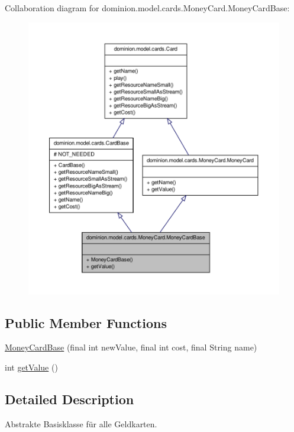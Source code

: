 \-Collaboration diagram for dominion.\-model.\-cards.\-Money\-Card.\-Money\-Card\-Base\-:
\nopagebreak
\begin{figure}[H]
\begin{center}
\leavevmode
\includegraphics[width=350pt]{classdominion_1_1model_1_1cards_1_1MoneyCard_1_1MoneyCardBase__coll__graph}
\end{center}
\end{figure}
\subsection*{\-Public \-Member \-Functions}
\begin{DoxyCompactItemize}
\item 
\hyperlink{classdominion_1_1model_1_1cards_1_1MoneyCard_1_1MoneyCardBase_a9a68dae37d91c1a45ef9fb344acaad57}{\-Money\-Card\-Base} (final int new\-Value, final int cost, final \-String name)
\item 
int \hyperlink{classdominion_1_1model_1_1cards_1_1MoneyCard_1_1MoneyCardBase_a362007fa46b0782072ae404629a7dfb2}{get\-Value} ()
\end{DoxyCompactItemize}


\subsection{\-Detailed \-Description}
\-Abstrakte \-Basisklasse für alle \-Geldkarten.

